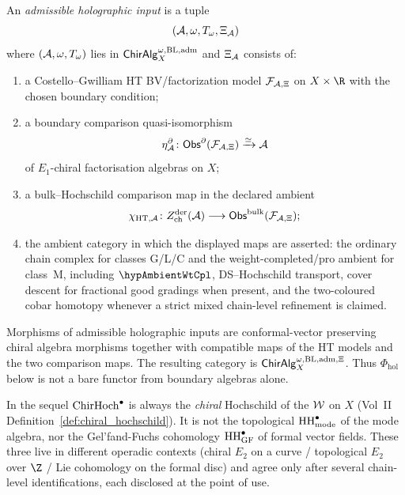 \begin{definition}
\label{def:uhf-xi-input}
An \emph{admissible holographic input} is a tuple
\[
(\mathcal{A},\omega,T_\omega,\Xi_{\mathcal{A}})
\]
where $(\mathcal{A},\omega,T_\omega)$ lies in
$\mathsf{ChirAlg}^{\omega,\mathrm{BL,adm}}_X$ and
\(\Xi_{\mathcal{A}}\) consists of:
\begin{enumerate}[label=\textup{(\roman*)}]
\item a Costello--Gwilliam HT BV/factorization model
 $\mathcal{F}_{\mathcal{A},\Xi}$ on $X\times\R$ with the chosen boundary condition;
\item a boundary comparison quasi-isomorphism
 \[
 \eta^\partial_{\mathcal{A}}\colon
 \mathsf{Obs}^\partial(\mathcal{F}_{\mathcal{A},\Xi})\xrightarrow{\simeq}\mathcal{A}
 \]
 of $E_1$-chiral factorisation algebras on $X$;
\item a bulk--Hochschild comparison map in the declared ambient
 \[
 \chi_{\mathrm{HT},\mathcal{A}}\colon
 Z^{\mathrm{der}}_{\mathrm{ch}}(\mathcal{A})\longrightarrow
 \mathsf{Obs}^{\mathrm{bulk}}(\mathcal{F}_{\mathcal{A},\Xi});
 \]
\item the ambient category in which the displayed maps are asserted:
 the ordinary chain complex for classes G/L/C and the
 weight-completed/pro ambient for class~M, including
 \(\hypAmbientWtCpl\), DS--Hochschild transport, cover descent for
 fractional good gradings when present, and the two-coloured cobar
 homotopy whenever a strict mixed chain-level refinement is claimed.
\end{enumerate}
Morphisms of admissible holographic inputs are conformal-vector
preserving chiral algebra morphisms together with compatible maps of
the HT models and the two comparison maps. The resulting category is
\(\mathsf{ChirAlg}^{\omega,\mathrm{BL,adm},\Xi}_X\). Thus
\(\Phi_{\mathrm{hol}}\) below is not a bare functor from boundary
algebras alone.
\end{definition}

\begin{remark}
\label{rem:uhf-three-hochschilds}
In the sequel $\mathrm{ChirHoch}^\bullet$ is always the \emph{chiral}
Hochschild of the $\mathcal{W}$ on $X$
(Vol~II Definition~\ref*{def:chiral_hochschild}). It is not the
topological $\mathrm{HH}^\bullet_{\mathrm{mode}}$ of the mode algebra, nor
the Gel'fand-Fuchs cohomology $\mathrm{HH}^\bullet_{\mathrm{GF}}$ of
formal vector fields. These three live in different operadic
contexts (chiral $E_2$ on a curve / topological $E_2$ over $\Z$ /
Lie cohomology on the formal disc) and agree only after several
chain-level identifications, each disclosed at the point of use.
\end{remark}

